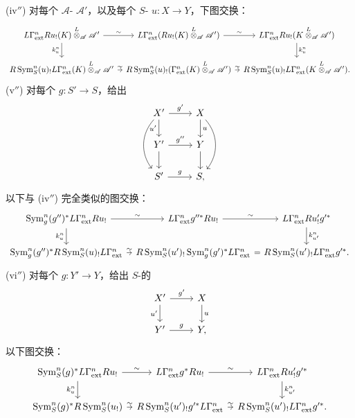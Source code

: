 (iv$''$) 对每个 $\mathscr A$- $\mathscr A'$，以及每个 $S$- $u:X\to Y$，下图交换：
\[\begin{tikzcd}[column sep=tiny]
L\Gamma^n_{\mathrm{ext}}Ru_!(K)\overset L\otimes_{\mathscr A}\mathscr A'\arrow[r,"\sim"]\arrow[d,"k^n_u"']&L\Gamma^n_{\mathrm{ext}}(Ru_!(K)\overset L\otimes_{\mathscr A}\mathscr A')\arrow[r,"\sim"]&L\Gamma^n_{\mathrm{ext}}Ru_!(K\overset L\otimes_{\mathscr A}\mathscr A')\arrow[d,"k^n_u"]\\
R\operatorname{Sym}^n_S(u)_!L\Gamma^n_{\mathrm{ext}}(K)\overset L\otimes_{\mathscr A}\mathscr A'\arrow[r,"\sim"]&R\operatorname{Sym}^n_S(u)_!(\Gamma^n_{\mathrm{ext}}(K)\overset L\otimes_{\mathscr A}\mathscr A')\arrow[r,"\sim"]&R\operatorname{Sym}^n_S(u)_!L\Gamma^n_{\mathrm{ext}}(K\overset L\otimes_{\mathscr A}\mathscr A').
\end{tikzcd}\]
(v$''$) 对每个 $g:S'\to S$，给出
\[\begin{tikzcd}
X'\arrow[r,"g'"]\arrow[d,"u'"']\arrow[dd,bend right=40]&X\arrow[d,"u"]\arrow[dd,bend left=40]\\
Y'\arrow[r,"g''"]\arrow[d]&Y\arrow[d]\\
S'\arrow[r,"g"]&S,
\end{tikzcd}\]
以下与 (iv$''$) 完全类似的图交换：
\[\begin{tikzcd}[column sep=tiny]
\operatorname{Sym}^n_g(g'')^*L\Gamma^n_{\mathrm{ext}}Ru_!\arrow[r,"\sim"]\arrow[d,"k^n_u"']&L\Gamma^n_{\mathrm{ext}}g''^*Ru_!\arrow[r,"\sim"]&L\Gamma^n_{\mathrm{ext}}Ru'_!g'^*\arrow[d,"k^n_{u'}"]\\
\operatorname{Sym}^n_g(g'')^*R\operatorname{Sym}^n_S(u)_!L\Gamma^n_{\mathrm{ext}}\arrow[r,"\sim"]&R\operatorname{Sym}^n_S(u')_!\operatorname{Sym}^n_g(g')^*L\Gamma^n_{\mathrm{ext}}\arrow[r,equal]&R\operatorname{Sym}^n_S(u')_!L\Gamma^n_{\mathrm{ext}}g'^* .
\end{tikzcd}\]
(vi$''$) 对每个 $g:Y'\to Y$，给出 $S$-的
\[\begin{tikzcd}X'\arrow[r,"g'"]\arrow[d,"u'"']&X\arrow[d,"u"]\\Y'\arrow[r,"g"]&Y,\end{tikzcd}\]
以下图交换：
\[\begin{tikzcd}[column sep=tiny]
\operatorname{Sym}^n_S(g)^*L\Gamma^n_{\mathrm{ext}}Ru_!\arrow[r,"\sim"]\arrow[d,"k^n_u"']&L\Gamma^n_{\mathrm{ext}}g^*Ru_!\arrow[r,"\sim"]&L\Gamma^n_{\mathrm{ext}}Ru'_!g'^*\arrow[d,"k^n_{u'}"]\\
\operatorname{Sym}^n_S(g)^*R\operatorname{Sym}^n_S(u_!)\arrow[r,"\sim"]&R\operatorname{Sym}^n_S(u')_!g'^*L\Gamma^n_{\mathrm{ext}}\arrow[r,"\sim"]&R\operatorname{Sym}^n_S(u')_!L\Gamma^n_{\mathrm{ext}}g'^*.
\end{tikzcd}\]
